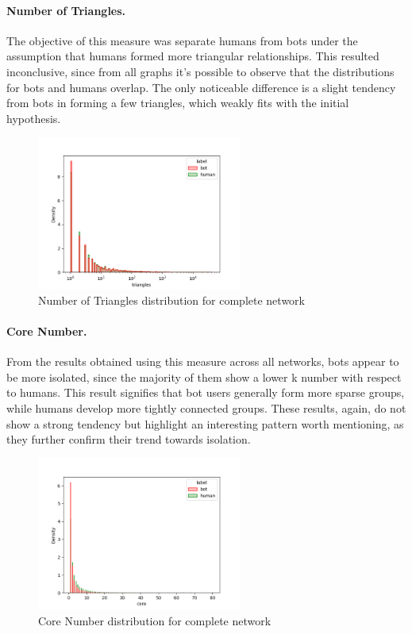 \documentclass[12pt, a4paper]{article}
\begin{document}
        \paragraph{Number of Triangles.} The objective of this measure was separate humans from bots under the assumption that humans formed more triangular relationships. This resulted inconclusive, since from all graphs it's possible to observe that the distributions for bots and humans overlap. The only noticeable difference is a slight tendency from bots in forming a few triangles, which weakly fits with the initial hypothesis.
        \begin{figure}[H]
        	\centering
            \includegraphics[width=0.6\textwidth]{complete_triangles_distribution.png}
            \caption{Number of Triangles distribution for complete network}
        \end{figure}
		\paragraph{Core Number.} From the results obtained using this measure across all networks, bots appear to be more isolated, since the majority of them show a lower k number with respect to humans. This result signifies that bot users generally form more sparse groups, while humans develop more tightly connected groups. These results, again, do not show a strong tendency but highlight an interesting pattern worth mentioning, as they further confirm their trend towards isolation.
		\begin{figure}[H]
        	\centering
            \includegraphics[width=0.6\textwidth]{complete_core_distribution.png}
            \caption{Core Number distribution for complete network}
        \end{figure}
\end{document}
